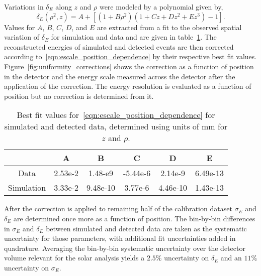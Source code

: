 Variations in $\delta_{E}$ along $z$ and $\rho$ were modeled by a polynomial given by,
\begin{equation}
    \delta_{E}(\rho^{2}, z) = A + \left[(1+B\rho^{2})(1+Cz+Dz^{2}+Ez^{3}) - 1\right]\text{.}
    \label{eqn:escale_position_dependence}
\end{equation}
Values for $A$, $B$, $C$, $D$, and $E$ are extracted from a fit to the observed
spatial variation of $\delta_{E}$ for simulation and data and are given in
table~\ref{tbl:n16_position_escale}.
The reconstructed energies of simulated and detected 
events are then corrected according to~\eqref{eqn:escale_position_dependence} by
their respective best fit values.
Figure~\ref{fig:uniformity_corrections} shows the correction as a function of
position in the detector and the energy scale measured across the detector
after the application of the correction.
The energy resolution is evaluated as a function of position but no correction
is determined from it.
\begin{table}
    \centering
\begin{tabular}{|c | c | c | c |c|c|}
\hline
& A&B&C&D&E\\
\hline
Data& 2.53e-2& 1.48-e9 & -5.44e-6 & 2.14e-9 & 6.49e-13\\
Simulation& 3.33e-2& 9.48e-10& 3.77e-6& 4.46e-10& 1.43e-13\\
\hline
\end{tabular}
\caption{Best fit values for~\eqref{eqn:escale_position_dependence} for
simulated and detected data, determined using units of mm for $z$ and $\rho$.}
\label{tbl:n16_position_escale}
\end{table}

After the correction is applied to remaining half of the calibration dataset
$\sigma_{E}$ and $\delta_{E}$ are determined once more as a function of position.
The bin-by-bin differences in $\sigma_{E}$ and $\delta_{E}$ between
simulated and detected data are taken as the systematic uncertainty for those
parameters, with additional fit uncertainties added in quadrature.
Averaging the bin-by-bin systematic uncertainty over the detector volume relevant
for the solar analysis yields a $2.5\%$ uncertainty on $\delta_{E}$ and an
$11\%$ uncertainty on $\sigma_{E}$.

